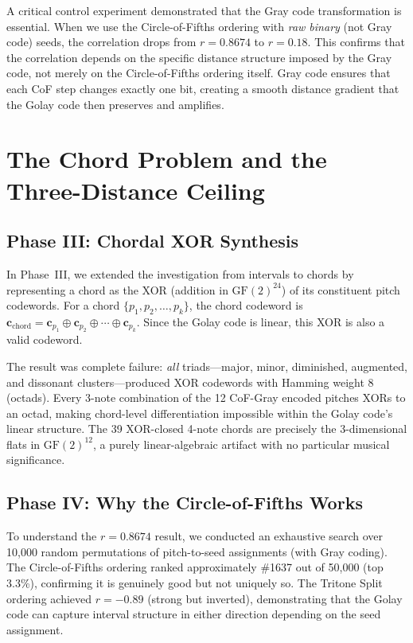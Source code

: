 \documentclass[11pt,a4paper]{article}
\theoremstyle{definition}
\begin{document}
A critical control experiment demonstrated that the Gray code transformation is essential. When we use the Circle-of-Fifths ordering with \emph{raw binary} (not Gray code) seeds, the correlation drops from $r = 0.8674$ to $r = 0.18$. This confirms that the correlation depends on the specific distance structure imposed by the Gray code, not merely on the Circle-of-Fifths ordering itself. Gray code ensures that each CoF step changes exactly one bit, creating a smooth distance gradient that the Golay code then preserves and amplifies.

\section{The Chord Problem and the Three-Distance Ceiling}\label{sec:chord_problem}

\subsection{Phase III: Chordal XOR Synthesis}

In Phase~III, we extended the investigation from intervals to chords by representing a chord as the XOR (addition in $\mathrm{GF}(2)^{24}$) of its constituent pitch codewords. For a chord $\{p_1, p_2, \ldots, p_k\}$, the chord codeword is $\mathbf{c}_{\text{chord}} = \mathbf{c}_{p_1} \oplus \mathbf{c}_{p_2} \oplus \cdots \oplus \mathbf{c}_{p_k}$. Since the Golay code is linear, this XOR is also a valid codeword.

The result was complete failure: \emph{all} triads---major, minor, diminished, augmented, and dissonant clusters---produced XOR codewords with Hamming weight 8 (octads). Every 3-note combination of the 12 CoF-Gray encoded pitches XORs to an octad, making chord-level differentiation impossible within the Golay code's linear structure. The 39 XOR-closed 4-note chords are precisely the 3-dimensional flats in $\mathrm{GF}(2)^{12}$, a purely linear-algebraic artifact with no particular musical significance.

\subsection{Phase IV: Why the Circle-of-Fifths Works}

To understand the $r = 0.8674$ result, we conducted an exhaustive search over 10,000 random permutations of pitch-to-seed assignments (with Gray coding). The Circle-of-Fifths ordering ranked approximately \#1637 out of 50,000 (top 3.3\%), confirming it is genuinely good but not uniquely so. The Tritone Split ordering achieved $r = -0.89$ (strong but inverted), demonstrating that the Golay code can capture interval structure in either direction depending on the seed assignment.
\end{document}

